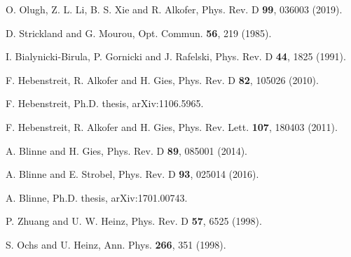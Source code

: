 \documentclass[aps,preprint,superscriptaddress]{revtex4}
\begin{document}
\begin{thebibliography}{99}
O. Olugh, Z. L. Li, B. S. Xie and R. Alkofer,
Phys. Rev. D {\textbf{99}}, 036003 (2019).

D. Strickland and G. Mourou,
Opt. Commun. {\textbf{56}}, 219 (1985).


I. Bialynicki-Birula, P. Gornicki and J. Rafelski,
Phys. Rev. D {\textbf{44}}, 1825 (1991).

F. Hebenstreit, R. Alkofer and H. Gies,
Phys. Rev. D {\textbf{82}}, 105026 (2010).
%

F. Hebenstreit, Ph.D. thesis, arXiv:1106.5965.
%

F. Hebenstreit, R. Alkofer and H. Gies,
Phys. Rev. Lett. {\textbf{107}}, 180403 (2011).
%

A. Blinne and H. Gies,
Phys. Rev. D {\textbf{89}}, 085001 (2014).
%

A. Blinne and E. Strobel,
Phys. Rev. D {\textbf{93}}, 025014 (2016).
%

A. Blinne, Ph.D. thesis, arXiv:1701.00743.
%


P. Zhuang and U. W. Heinz,
Phys. Rev. D {\textbf {57}}, 6525 (1998).
%

S. Ochs and U. Heinz,
Ann. Phys. {\textbf{266}}, 351 (1998).


\end{thebibliography}
\end{document}
